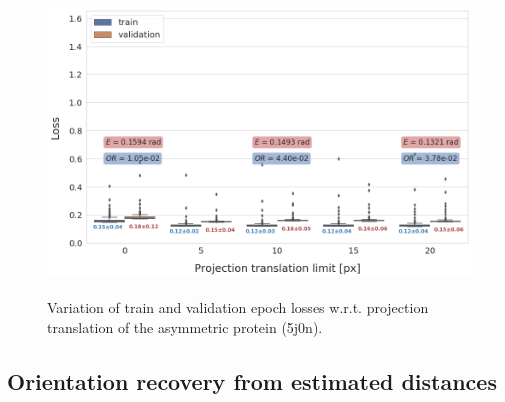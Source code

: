 \begin{figure}
    \centering
        \includegraphics[height=8cm]{images/de_translation_nums.png}
        \caption{Variation of train and validation epoch losses w.r.t. projection translation of the asymmetric protein (5j0n).}
    \label{fig:distance-estimation-vary-projection-translation}
\end{figure}

\subsection{Orientation recovery from estimated distances}


